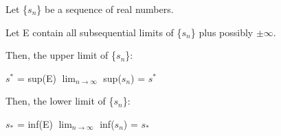 	\begin{adjustbox}{minipage=14cm, right, vspace=0.1cm 0cm}
		Let \{$s_n$\} be a sequence of real numbers.

		Let E contain all subsequential limits of \{$s_n$\}
		plus possibly $\pm$$\infty$.

		Then, the upper limit of \{$s_n$\}:

		\hspace{1cm}
		$s^*$ = sup(E) \hspace{1cm} $\lim_{n \rightarrow \infty}$ sup($s_n$) = $s^*$

		Then, the lower limit of \{$s_n$\}:

		\hspace{1cm}
		$s_*$ = inf(E) \hspace{1.2cm} $\lim_{n \rightarrow \infty}$ inf($s_n$) = $s_*$ \\
	\end{adjustbox}






































